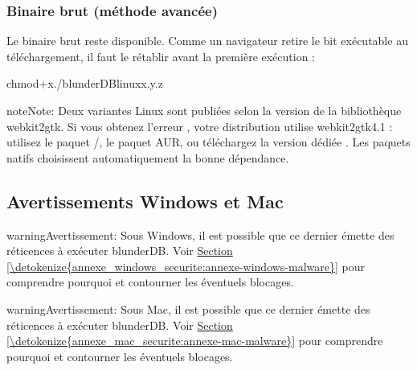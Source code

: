 \documentclass[letterpaper,10pt,french]{sphinxmanual}
\begin{document}
\subsubsection{Binaire brut (méthode avancée)}
\label{\detokenize{telecharge_install:binaire-brut-methode-avancee}}
\sphinxAtStartPar
Le binaire brut  reste disponible. Comme un navigateur retire
le bit exécutable au téléchargement, il faut le rétablir avant la première
exécution :

\begin{sphinxVerbatim}[commandchars=\\\{\}]
chmod+x./blunderDB\PYGZhy{}linux\PYGZhy{}x.y.z
\end{sphinxVerbatim}

\begin{sphinxadmonition}{note}{Note:}
\sphinxAtStartPar
Deux variantes Linux sont publiées selon la version de la
bibliothèque webkit2gtk. Si vous obtenez l’erreur
, votre
distribution utilise webkit2gtk\sphinxhyphen{}4.1 : utilisez le paquet /,
le paquet AUR, ou téléchargez la version dédiée
. Les paquets natifs choisissent
automatiquement la bonne dépendance.
\end{sphinxadmonition}


\subsection{Avertissements Windows et Mac}
\label{\detokenize{telecharge_install:avertissements-windows-et-mac}}
\begin{sphinxadmonition}{warning}{Avertissement:}
\sphinxAtStartPar
Sous Windows, il est possible que ce dernier émette des réticences
à exécuter blunderDB. Voir \hyperref[\detokenize{annexe_windows_securite:annexe-windows-malware}]{Section \ref{\detokenize{annexe_windows_securite:annexe-windows-malware}}} pour comprendre
pourquoi et contourner les éventuels blocages.
\end{sphinxadmonition}

\begin{sphinxadmonition}{warning}{Avertissement:}
\sphinxAtStartPar
Sous Mac, il est possible que ce dernier émette des réticences
à exécuter blunderDB. Voir \hyperref[\detokenize{annexe_mac_securite:annexe-mac-malware}]{Section \ref{\detokenize{annexe_mac_securite:annexe-mac-malware}}} pour comprendre
pourquoi et contourner les éventuels blocages.
\end{sphinxadmonition}
\end{document}
